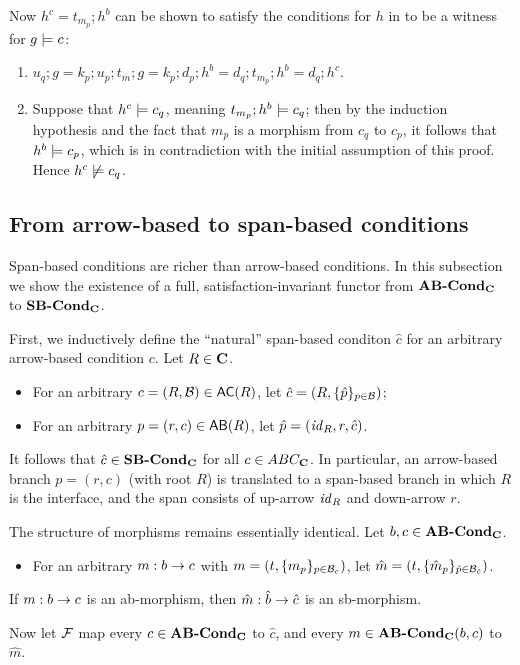 Now $h^c=t_{m_p};h^b$ can be shown to satisfy the conditions for $h$ in  to be a witness for $g\models c$:
\begin{enumerate}
\item $u_q;g = k_p;u_p;t_m;g= k_p;d_p;h^b = d_q;t_{m_p};h^b=d_q;h^c$.
\item Suppose that $h^c\models c_q$, meaning $t_{m_p};h^b\models c_q$; then by the induction hypothesis and the fact that $m_p$ is a morphism from $c_q$ to $c_p$, it follows that $h^b\models c_p$, which is in contradiction with the initial assumption of this proof. Hence $h^c\not\models c_q$.
\end{enumerate}

\subsection{From arrow-based to span-based conditions}

Span-based conditions are richer than arrow-based conditions. In this subsection we show the existence of a full, satisfaction-invariant functor from $\textbf{AB-Cond}_{\mathbf{C}}$ to $\textbf{SB-Cond}_{\mathbf{C}}$.

First, we inductively define the ``natural'' span-based conditon $\hat c$ for an arbitrary arrow-based condition $c$. Let $R\in\mathbf{C}$.
\begin{itemize}
\item For an arbitrary $c=(R,\cB)\in \AC R$, let $\hat c=(R,\{{\hat p}\}_{p\in\mathcal{B}})$; 
\item For an arbitrary $p=(r,c)\in \AB R$, let $\hat p=(\mathit{id}_R,r,\hat c)$.
\end{itemize}
%
It follows that $\hat c\in \textbf{SB-Cond}_{\mathbf{C}}$ for all $c\in ABC_{\mathbf{C}}$. In particular, an arrow-based branch $p=(r,c)$ (with root $R$) is translated to a span-based branch in which $R$ is the interface, and the span consists of up-arrow $\mathit{id}_R$ and down-arrow $r$.

The structure of morphisms remains essentially identical. Let $b,c\in \textbf{AB-Cond}_{\mathbf{C}}$.
%
\begin{itemize}
\item For an arbitrary $m:b\rightarrow c$ with $m=(t,\{{m_p}\}_{p\in \mathcal{B}_c})$, let $\hat m=(t,\{{\hat m_p}\}_{\hat p\in \mathcal{B}_{\hat c}})$.
\end{itemize}
%
\begin{proposition}
If $m:b\rightarrow c$ is an ab-morphism, then $\hat m:\hat b\rightarrow \hat c$ is an sb-morphism.
\end{proposition}
%
Now let $\mathcal{F}$ map every $c\in \textbf{AB-Cond}_{\mathbf{C}}$ to $\hat c$, and every $m\in \textbf{AB-Cond}_{\mathbf{C}}(b,c)$ to $\hat m$.

